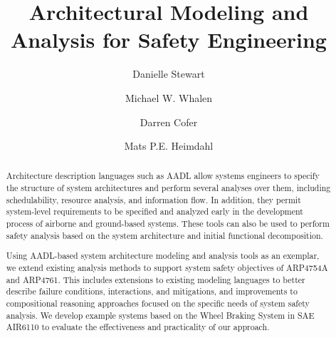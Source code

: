 \documentclass{llncs}
\begin{document}
\newcommand{\stateequiv}{\equiv_{s}}
\newcommand{\traceequiv}{\equiv_{\sigma}}
\newcommand{\ta}{\text{TA}}
\newcommand{\cta}{\text{TA$_{C}$}}
\newcommand{\tta}{\text{TA$_{T}$}}
\newcommand{\ucalg}{\texttt{\small{IVC\_UC}}}
\newcommand{\ucbfalg}{\texttt{\small{IVC\_UCBF}}}


\title{Architectural Modeling and Analysis for Safety Engineering}
%
\author{Danielle Stewart
\and Michael W. Whalen
\and Darren Cofer
\and Mats P.E. Heimdahl }
\maketitle

\begin{abstract}
Architecture description languages such as AADL allow systems engineers to specify the structure of system architectures and perform several analyses over them, including schedulability, resource analysis, and information flow.  In addition, they
permit system-level requirements to be specified and analyzed early in the development process of airborne and ground-based systems. These tools can also be used to perform safety analysis based on the system architecture and initial functional decomposition.


Using AADL-based system architecture modeling and analysis tools as an exemplar, we extend existing analysis methods to support system safety objectives of ARP4754A and ARP4761. This includes extensions to existing modeling languages to better describe failure conditions, interactions, and mitigations, and improvements to compositional reasoning approaches focused on the specific needs of system safety analysis. We develop example systems based on the Wheel Braking System in SAE AIR6110 to evaluate the effectiveness and practicality of our approach.
\end{abstract}
\end{document}
